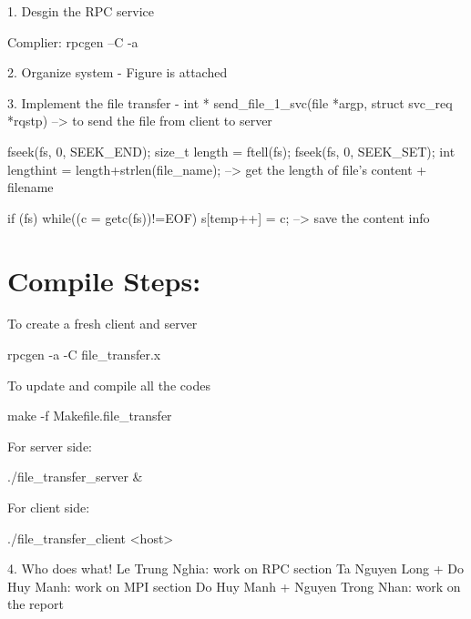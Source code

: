 \documentclass{article}
\title{Report #2: RPC}
\author{Le Trung Nghia - USTHBI5-098 ** Ta Nguyen Long - USTHBI5-080 \\ Do Huy Manh - USTHBI6-093 ** Nguyen Trong Nhan - USTHBI4-115 }
\date{January 2018}
\begin{document}
1. Desgin the RPC service

Complier: rpcgen –C -a

2. Organize system
 - Figure is attached
 
3. Implement the file transfer
- int *
send_file_1_svc(file *argp, struct svc_req *rqstp)
--> to send the file from client to server

fseek(fs, 0, SEEK_END);    
	size_t length = ftell(fs); 
	fseek(fs, 0, SEEK_SET);
	int lengthint = length+strlen(file_name);
--> get the length of file's content + filename

if (fs){
	while((c = getc(fs))!=EOF)
	s[temp++] = c;
	}
--> save the content info

 \section{Compile Steps:}

To create a fresh client and server

rpcgen -a -C file_transfer.x

To update and compile all the codes

make -f Makefile.file_transfer

For server side:

./file_transfer_server &

For client side:

./file_transfer_client <host>


4. Who does what!
Le Trung Nghia: work on RPC section
Ta Nguyen Long + Do Huy Manh: work on MPI section
Do Huy Manh + Nguyen Trong Nhan: work on the report
\end{document}
